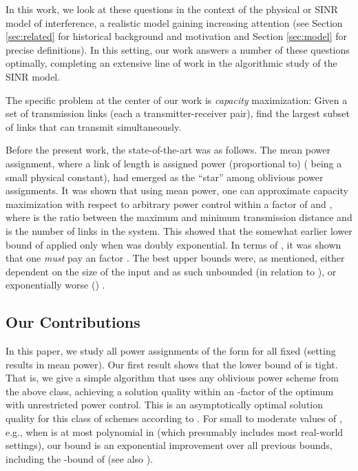 \documentclass[11pt]{amsart}
\begin{document}
In this work, we look at these questions in the context of the physical or SINR model
of interference, a realistic model gaining 
increasing
attention (see Section \ref{sec:related} for historical background and motivation and Section \ref{sec:model} for precise definitions). In this setting,
our work answers a number of these questions optimally, completing an extensive
line of work in the algorithmic study of the SINR model.

The specific problem at the center of our work is \emph{capacity} maximization: Given a set of transmission links (each a transmitter-receiver pair), 
find the largest subset of links that can transmit simultaneously.

Before the present work, the state-of-the-art was as follows. The mean power assignment,
where a link of length  is assigned power (proportional to)  ( being a small
physical constant), had emerged as the ``star'' among oblivious power assignments. It was
shown that using mean power, one can approximate capacity maximization with respect to arbitrary power control 
within a factor of  
 \cite{us:esa09full} and  \cite{SODA11}, where  is the ratio between the maximum and minimum
transmission distance and  is the number of links in the system. 
This showed that the somewhat earlier lower bound of  \cite{FKRV09} applied only when  was doubly exponential. In terms of , it was shown
that one \emph{must} pay an 
factor \cite{us:esa09full}. The best upper bounds were, as mentioned, either dependent 
on the size of the input \cite{us:esa09full,SODA11} and as such
unbounded (in relation to ), or exponentially worse  ()
\cite{DBLP:conf/infocom/AndrewsD09,gouss2007a}.




\subsection{Our Contributions}


In this paper, we study all power assignments of the form  for all fixed  (setting 
results in mean power). Our first result shows that the lower bound of
 is tight.  That is, we give a simple
algorithm that uses any oblivious power scheme from the above class,
achieving a solution quality within an -factor of the 
optimum with unrestricted power control. This is an asymptotically optimal solution quality for this class of schemes according to \cite{us:esa09full}. For small to moderate values
of , e.g., when  is at most polynomial in  (which
presumably includes most real-world settings), our bound is an
exponential improvement over all previous bounds, including the -bound of \cite{DBLP:conf/infocom/AndrewsD09} (see also
\cite{gouss2007a}).
\end{document}
